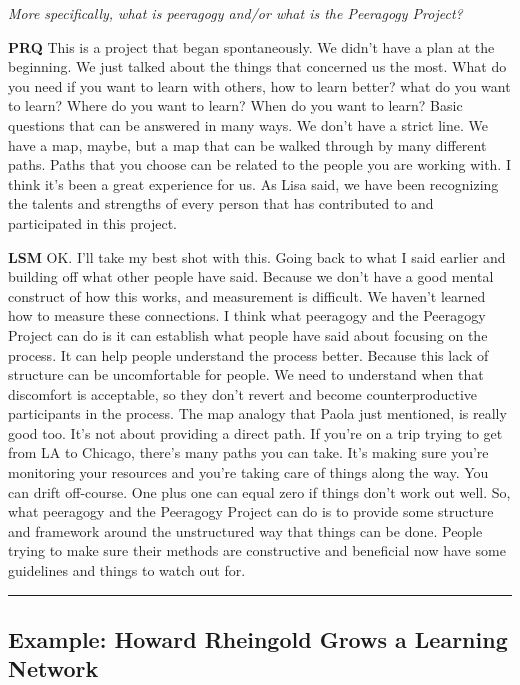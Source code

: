 \emph{More specifically, what is peeragogy and/or what is the Peeragogy
Project?}

\textbf{PRQ} This is a project that began spontaneously. We didn't have
a plan at the beginning. We just talked about the things that concerned
us the most. What do you need if you want to learn with others, how to
learn better? what do you want to learn? Where do you want to learn?
When do you want to learn? Basic questions that can be answered in many
ways. We don't have a strict line. We have a map, maybe, but a map that
can be walked through by many different paths. Paths that you choose can
be related to the people you are working with. I think it's been a great
experience for us. As Lisa said, we have been recognizing the talents
and strengths of every person that has contributed to and participated
in this project.

\textbf{LSM} OK. I'll take my best shot with this. Going back to what I
said earlier and building off what other people have said. Because we
don't have a good mental construct of how this works, and measurement is
difficult. We haven't learned how to measure these connections. I think
what peeragogy and the Peeragogy Project can do is it can establish what
people have said about focusing on the process. It can help people
understand the process better. Because this lack of structure can be
uncomfortable for people. We need to understand when that discomfort is
acceptable, so they don't revert and become counter­productive
participants in the process. The map analogy that Paola just mentioned,
is really good too. It's not about providing a direct path. If you're on
a trip trying to get from LA to Chicago, there's many paths you can
take. It's making sure you're monitoring your resources and you're
taking care of things along the way. You can drift off-course. One plus
one can equal zero if things don't work out well. So, what peeragogy and
the Peeragogy Project can do is to provide some structure and framework
around the unstructured way that things can be done. People trying to
make sure their methods are constructive and beneficial now have some
guidelines and things to watch out for.

\begin{center}\rule{0.5\linewidth}{\linethickness}\end{center}

\subsection{Example: Howard Rheingold Grows a Learning
Network}\label{example-howard-rheingold-grows-a-learning-network}

